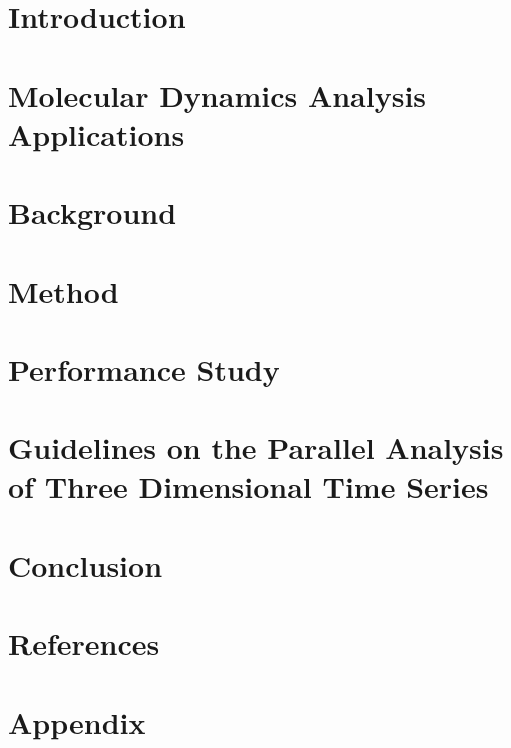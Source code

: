 \documentclass[review]{elsarticle}
\begin{document}
\linenumbers

\section{Introduction}


\section{Molecular Dynamics Analysis Applications}


\section{Background}


\section{Method}


\section{Performance Study}


\section{Guidelines on the Parallel Analysis of Three Dimensional Time Series}


\section{Conclusion}


\section*{References}



\clearpage

\appendix
\section{Appendix}

%

\end{document}
